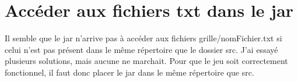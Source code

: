 \documentclass{report}
\begin{document}
\section{Accéder aux fichiers txt dans le jar}
Il semble que le jar n'arrive pas à accéder aux fichiers grille/nomFichier.txt si celui n'est pas présent dans le même répertoire que le dossier src. J'ai essayé plusieurs solutions, mais aucune ne marchait. Pour que le jeu soit correctement fonctionnel, il faut donc placer le jar dans le même répertoire que src.
\end{document}
